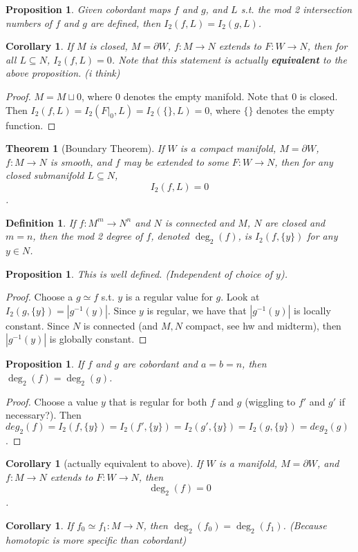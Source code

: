\documentclass[11pt]{amsbook}
\theoremstyle{mystyle} \newtheorem{thrm}[thm]{Theorem}
\theoremstyle{mystyle} \newtheorem{defi}[thm]{Definition}
\theoremstyle{mystyle} \newtheorem{coro}[thm]{Corollary}
\theoremstyle{mystyle} \newtheorem{propo}[thm]{Proposition}
\theoremstyle{mystyle} \newtheorem{lemm}[thm]{Lemma}
\numberwithin{thm}{section}
\newcommand{\homotopic}{\simeq}
\renewcommand{\d}{\partial}
\newcommand{\de}{\emph}
\begin{document}
\begin{propo}
	Given cobordant maps $f$ and $g$, and $L$ s.t. the mod 2 intersection numbers of $f$ and $g$ are defined, then $I_2(f, L) = I_2(g, L)$.
\end{propo}
\begin{coro}
	If $M$ is closed, $M = \d W$, $f: M \to N$ extends to $F: W \to N$, then for all $L \subseteq N$, $I_2(f, L) = 0$.  Note that this statement is actually \textbf{equivalent} to the above proposition. (i think)
\end{coro}
\begin{proof}
	$M = M \sqcup 0$, where 0 denotes the empty manifold.  Note that 0 is closed.  Then $I_2(f, L) = I_2(F|_0, L) = I_2(\{\}, L) = 0$, where $\{\}$ denotes the empty function.
\end{proof}
\begin{thrm}[Boundary Theorem]
	If $W$ is a compact manifold, $M = \d W$, $f: M \to N$ is smooth, and $f$ may be extended to some $F: W \to N$, then for any closed submanifold $L \subseteq N$, $$I_2(f, L) = 0$$.
\end{thrm}
\begin{defi}
	If $f : M^m \to N^n$ and $N$ is connected and $M$, $N$ are closed and $m=n$, then the \de{mod 2 degree} of $f$, denoted $\deg_2(f)$, is $I_2(f, \{y\})$ for any $y \in N$.
\end{defi}

\begin{propo}
	This is well defined.  (Independent of choice of $y$).
\end{propo}
\begin{proof}
	Choose a $g \homotopic f$ s.t. $y$ is a regular value for $g$.  Look at $I_2(g, \{y\}) = |g^{-1}(y)|$.  Since $y$ is regular, we have that $|g^{-1}(y)|$ is locally constant.  Since $N$ is connected (and $M,N$ compact, see hw and midterm), then $|g^{-1}(y)|$ is globally constant.
\end{proof}
\begin{propo}
	If $f$ and $g$ are cobordant and $a=b=n$, then \\$\deg_2(f) = \deg_2(g)$.
\end{propo}
\begin{proof}
	Choose a value $y$ that is regular for both $f$ and $g$ (wiggling to $f'$ and $g'$ if necessary?).  Then $deg_2(f) = I_2(f, \{y\}) = I_2(f', \{y\}) = I_2(g', \{y\}) = I_2(g, \{y\}) = deg_2(g)$.
\end{proof}
\begin{coro}[actually equivalent to above]
	If $W$ is a manifold, $M = \d W$, and
	$f: M \to N$
	extends to $F: W \to N$,
	then $$\deg_2(f) = 0$$.
\end{coro}
\begin{coro}
	If $f_0 \homotopic f_1: M \to N$, then $\deg_2(f_0) = \deg_2(f_1)$.  (Because homotopic is more specific than cobordant)
\end{coro}
\end{document}
